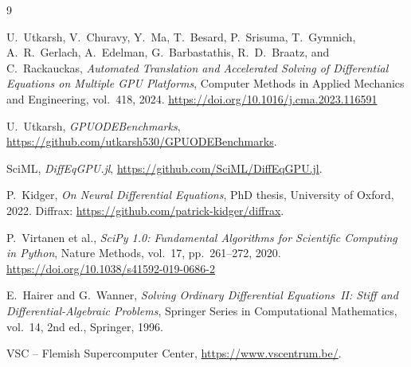 \documentclass[11pt]{article}
\begin{document}
\begin{thebibliography}{9}

U.~Utkarsh, V.~Churavy, Y.~Ma, T.~Besard, P.~Srisuma,
T.~Gymnich, A.~R.~Gerlach, A.~Edelman, G.~Barbastathis,
R.~D.~Braatz, and C.~Rackauckas,
\emph{Automated Translation and Accelerated Solving of
Differential Equations on Multiple GPU Platforms},
Computer Methods in Applied Mechanics and Engineering,
vol.~418, 2024.
\newblock \url{https://doi.org/10.1016/j.cma.2023.116591}

U.~Utkarsh,
\emph{GPUODEBenchmarks},
\url{https://github.com/utkarsh530/GPUODEBenchmarks}.

SciML,
\emph{DiffEqGPU.jl},
\url{https://github.com/SciML/DiffEqGPU.jl}.

P.~Kidger,
\emph{On Neural Differential Equations}, PhD thesis,
University of Oxford, 2022.
\newblock Diffrax: \url{https://github.com/patrick-kidger/diffrax}.

P.~Virtanen et al.,
\emph{SciPy 1.0: Fundamental Algorithms for Scientific Computing
in Python},
Nature Methods, vol.~17, pp.~261--272, 2020.
\newblock \url{https://doi.org/10.1038/s41592-019-0686-2}

E.~Hairer and G.~Wanner,
\emph{Solving Ordinary Differential Equations~II: Stiff and
Differential-Algebraic Problems},
Springer Series in Computational Mathematics, vol.~14,
2nd ed., Springer, 1996.

VSC -- Flemish Supercomputer Center,
\url{https://www.vscentrum.be/}.

\end{thebibliography}
\end{document}

